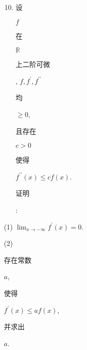 \documentclass[10pt]{article}
\begin{document}
\begin{enumerate}
  \setcounter{enumi}{9}
  \item \begin{CJK}{UTF8}{mj}设\end{CJK} $f$ \begin{CJK}{UTF8}{mj}在\end{CJK} $\mathbb{R}$ \begin{CJK}{UTF8}{mj}上二阶可微\end{CJK}, $f, f^{\prime}, f^{\prime \prime}$ \begin{CJK}{UTF8}{mj}均\end{CJK} $\geqslant 0$, \begin{CJK}{UTF8}{mj}且存在\end{CJK} $c>0$ \begin{CJK}{UTF8}{mj}使得\end{CJK} $f^{\prime \prime}(x) \leqslant c f(x)$. \begin{CJK}{UTF8}{mj}证明\end{CJK}:
\end{enumerate}
(1) $\lim _{x \rightarrow-\infty} f^{\prime}(x)=0$.

(2) \begin{CJK}{UTF8}{mj}存在常数\end{CJK} $a$, \begin{CJK}{UTF8}{mj}使得\end{CJK} $f^{\prime}(x) \leqslant a f(x)$, \begin{CJK}{UTF8}{mj}并求出\end{CJK} $a$.
\end{document}
